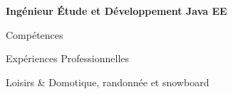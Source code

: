 \vspace{0.2cm}

\begin{center}
	\textbf{\huge{Ingénieur Étude et Développement Java EE}}
\end{center}

\vspace{0.2cm}

\begin{rubriquetableau}[\firstcolumnwidth]{Compétences}
	
	
\end{rubriquetableau}

\begin{rubriquetableau}[\firstcolumnwidth]{Expériences Professionnelles}
    
    
    
	
\end{rubriquetableau}
    


\begin{rubriquetableau}[\firstcolumnwidth]{Loisirs}
	& Domotique, randonnée et snowboard
\end{rubriquetableau}

